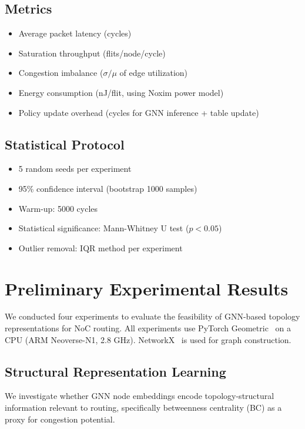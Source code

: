 \documentclass[conference]{IEEEtran}
\begin{document}
\subsection{Metrics}
\begin{itemize}
 \item Average packet latency (cycles)
 \item Saturation throughput (flits/node/cycle)
 \item Congestion imbalance ($\sigma/\mu$ of edge utilization)
 \item Energy consumption (nJ/flit, using Noxim power model)
 \item Policy update overhead (cycles for GNN inference + table update)
\end{itemize}

\subsection{Statistical Protocol}
\begin{itemize}
 \item 5 random seeds per experiment
 \item 95\% confidence interval (bootstrap 1000 samples)
 \item Warm-up: 5000 cycles
 \item Statistical significance: Mann-Whitney U test ($p<0.05$)
 \item Outlier removal: IQR method per experiment
\end{itemize}

\section{Preliminary Experimental Results}
\label{sec:results}

We conducted four experiments to evaluate the feasibility of GNN-based topology representations for NoC routing. All experiments use PyTorch Geometric~\cite{pyg2019} on a CPU (ARM Neoverse-N1, 2.8 GHz). NetworkX~\cite{networkx2008} is used for graph construction.

\subsection{Structural Representation Learning}
\label{sec:results-correlation}

We investigate whether GNN node embeddings encode topology-structural information relevant to routing, specifically betweenness centrality (BC) as a proxy for congestion potential.
\end{document}
